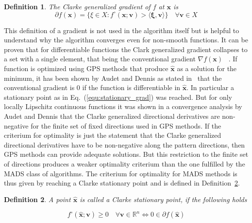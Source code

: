 \documentclass[a4paper,10pt]{article}
\newtheorem{definition}{Definition}
\renewcommand{\vec}[1]{\mathbf{#1}}
\newcommand{\equref}[1]{Eq.~(\ref{#1})}
\newcommand{\defref}[1]{Definition~\ref{#1}}
\begin{document}
    \begin{definition}
        The Clarke generalized gradient of $f$ at $\vec{x}$ is
        \begin{equation}
            \partial f(\vec{x}) = 
            \{\xi \in X : f^{\circ}(\vec{x}; \vec{v}) >
             \langle \vec{\xi}, \vec{v} \rangle\}
             \quad \forall \vec{v} \in X
        \end{equation}
    \end{definition}

    This definition of a gradient is not used in the algorithm itself
    but is helpful to understand why the algorithm converges even
    for non-smooth functions.
    It can be proven that for differentiable functions the Clark
    generalized gradient collapses to a set with a single element,
    that being the conventional gradient $\nabla f(\vec{x})$
    ~\cite{mads_original}.
    If function is optimized using GPS methods 
    that produce $\vec{\hat{x}}$ as a solution for the minimum,
    it has been shown by Audet and Dennis as stated in~\cite{mads_original}
    that the conventional gradient is 0 if the function is
    differentiable in $\vec{\hat{x}}$.
    In particular a stationary point as in \equref{equ:stationary_grad}
    was reached.
    But for only locally Lipschitz continuous functions it was shown
    in a convergence analysis by Audet and Dennis that the Clarke 
    generalized directional
    derivatives are non-negative for the finite set of fixed directions
    used in GPS methods.
    If the criterium for optimality is just the statement that the
    Clarke generalized directional derivatives have to be non-negative
    along the pattern directions, then GPS methods can provide
    adequate solutions.
    But this restriction to the finite set of directions produces a 
    weaker optimality criterium than the one fulfilled by the
    MADS class of algorithms.
    The criterium for optimality for MADS methods is thus given by
    reaching a Clarke stationary point and is defined in 
    \defref{def:stationary_clarke}.
    
    \begin{definition}
        \label{def:stationary_clarke}
        A point $\vec{\hat{x}}$ is called a Clarke stationary point,
        if the following holds
        
        \begin{equation}
            f^{\circ}(\vec{\hat{x}}; \vec{v}) \geq 0 \quad \forall
             \vec{v} \in \mathbb{R}^n
            \Longleftrightarrow
            0 \in \partial f(\vec{\hat{x}})
        \end{equation}
    \end{definition}
\end{document}
